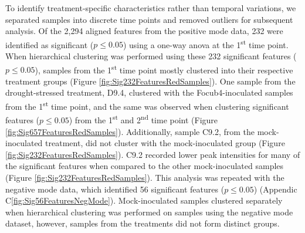 To identify treatment-specific characteristics rather than temporal variations, we separated samples into discrete time points and removed outliers for subsequent analysis. Of the 2,294 aligned features from the positive mode data, 232 were identified as significant ($p \le0.05$) using a one-way \ac{anova} at the 1\textsuperscript{st} time point. When hierarchical clustering was performed using these 232 significant features ($p \le0.05$), samples from the 1\textsuperscript{st} time point mostly clustered into their respective treatment groups (Figure \ref{fig:Sig232FeaturesRedSamples}). One sample from the drought-stressed treatment, D9.4, clustered with the \ac{Focub4}-inoculated samples from the 1\textsuperscript{st} time point, and the same was observed when clustering significant features ($p \le0.05$) from the 1\textsuperscript{st} and 2\textsuperscript{nd} time point (Figure \ref{fig:Sig657FeaturesRedSamples}). Additionally, sample C9.2, from the mock-inoculated treatment, did not cluster with the mock-inoculated group (Figure \ref{fig:Sig232FeaturesRedSamples}). C9.2 recorded lower peak intensities for many of the significant features when compared to the other mock-inoculated samples (Figure \ref{fig:Sig232FeaturesRedSamples}). This analysis was repeated with the negative mode data, which identified 56 significant features ($p \le0.05$) (Appendic C\ref{fig:Sig56FeaturesNegMode}). Mock-inoculated samples clustered separately when hierarchical clustering was performed on samples using the negative mode dataset, however, samples from the treatments did not form distinct groups.


